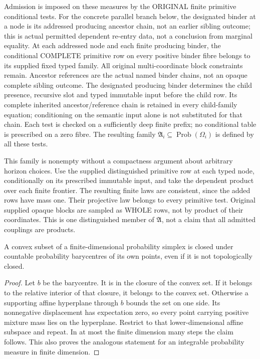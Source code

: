 \documentclass[11pt]{article}
\begin{document}
Admission is imposed on these measures by the ORIGINAL finite primitive conditional tests. For the concrete parallel branch below, the designated binder at a node is its addressed producing ancestor chain, not an earlier sibling outcome; this is actual permitted dependent re-entry data, not a conclusion from marginal equality. At each addressed node and each finite producing binder, the conditional COMPLETE primitive row on every positive binder fibre belongs to its supplied fixed typed family. All original multi-coordinate block constraints remain. Ancestor references are the actual named binder chains, not an opaque complete sibling outcome. The designated producing binder determines the child presence, recursive slot and typed immutable input before the child row. Its complete inherited ancestor/reference chain is retained in every child-family equation; conditioning on the semantic input alone is not substituted for that chain. Each test is checked on a sufficiently deep finite prefix; no conditional table is prescribed on a zero fibre. The resulting family $\mathfrak A_i\subseteq\operatorname{Prob}(\Omega_i)$ is defined by all these tests.

This family is nonempty without a compactness argument about arbitrary horizon choices. Use the supplied distinguished primitive row at each typed node, conditionally on its prescribed immutable input, and take the dependent product over each finite frontier. The resulting finite laws are consistent, since the added rows have mass one. Their projective law belongs to every primitive test. Original supplied opaque blocks are sampled as WHOLE rows, not by product of their coordinates. This is one distinguished member of $\mathfrak A$, not a claim that all admitted couplings are products.

\begin{lemma}
A convex subset of a finite-dimensional probability simplex is closed under countable probability barycentres of its own points, even if it is not topologically closed.
\end{lemma}
\begin{proof}
Let $b$ be the barycentre. It is in the closure of the convex set. If it belongs to the relative interior of that closure, it belongs to the convex set. Otherwise a supporting affine hyperplane through $b$ bounds the set on one side. Its nonnegative displacement has expectation zero, so every point carrying positive mixture mass lies on the hyperplane. Restrict to that lower-dimensional affine subspace and repeat. In at most the finite dimension many steps the claim follows. This also proves the analogous statement for an integrable probability measure in finite dimension.\end{proof}
\end{document}

